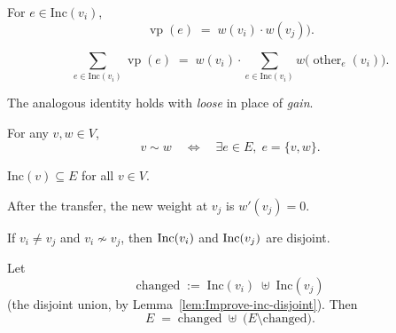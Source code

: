 \begin{lemma}\label{lem:gain-edge-decomp}
For $e\in \mathrm{Inc}(v_i)$,
\[
  \operatorname{vp}(e) \;=\; w(v_i)\cdot
  w(v_j)).
\]
\leanok
{}
\end{lemma}

\begin{lemma}\label{lem:gain-edge-sum}
\[
  \sum_{e\in \mathrm{Inc}(v_i)}\operatorname{vp}(e)
  \;=\;
  w(v_i)\cdot
  \sum_{e\in \mathrm{Inc}(v_i)}
  w\!\bigl(\operatorname{other}_e(v_i)\bigr).
\]
\leanok
{}
\end{lemma}

\begin{lemma}\label{lem:loose-edge-sum}
The analogous identity holds with \emph{loose} in place of \emph{gain}.
\leanok
{}
\end{lemma}

\begin{lemma}\label{lem:edge-mem-iff}
For any $v,w\in V$,
\[
  v\sim w \quad\Longleftrightarrow\quad
  \exists e\in E,\; e=\{v,w\}.
\]
\leanok
\uses{}
\end{lemma}

\begin{lemma}\label{lem:incidence-subset}
$\mathrm{Inc}(v)\subseteq E$ for all $v\in V$.
\leanok
\uses{}
\end{lemma}

\begin{lemma}[Effect at \(v_j\)]\label{lem:Improve-loose-zero}
After the transfer, the new weight at \(v_j\) is $w'(v_j)=0$.
\leanok
{}
\end{lemma}

\begin{lemma}\label{lem:Improve-inc-disjoint}
If $v_i \ne v_j$ and $v_i \not\sim v_j$, then
$\mathrm{Inc}(v_i)$ and $\mathrm{Inc}(v_j)$ are disjoint.
\leanok
{}
\end{lemma}

\begin{lemma}\label{lem:Improve-partition}
Let
\[
  \mathrm{changed}\;:=\;\mathrm{Inc}(v_i)\;\uplus\;
  \mathrm{Inc}(v_j)
\]
(the disjoint union, by Lemma~\ref{lem:Improve-inc-disjoint}).
Then
\[
  E \;=\; \mathrm{changed}\;\uplus\; \bigl(E\setminus \mathrm{changed}\bigr).
\]
\leanok
{}
\end{lemma}

